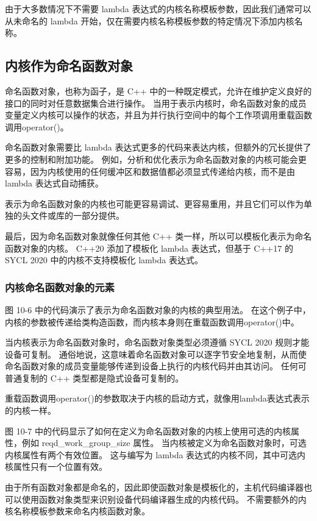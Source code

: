 由于大多数情况下不需要 lambda 表达式的内核名称模板参数，因此我们通常可以从未命名的 lambda 开始，仅在需要内核名称模板参数的特定情况下添加内核名称。

\subsection{内核作为命名函数对象}
命名函数对象，也称为函子，是 C++ 中的一种既定模式，允许在维护定义良好的接口的同时对任意数据集合进行操作。 当用于表示内核时，命名函数对象的成员变量定义内核可以操作的状态，并且为并行执行空间中的每个工作项调用重载函数调用operator()。

命名函数对象需要比 lambda 表达式更多的代码来表达内核，但额外的冗长提供了更多的控制和附加功能。 例如，分析和优化表示为命名函数对象的内核可能会更容易，因为内核使用的任何缓冲区和数据值都必须显式传递给内核，而不是由 lambda 表达式自动捕获。

表示为命名函数对象的内核也可能更容易调试、更容易重用，并且它们可以作为单独的头文件或库的一部分提供。

最后，因为命名函数对象就像任何其他 C++ 类一样，所以可以模板化表示为命名函数对象的内核。 C++20 添加了模板化 lambda 表达式，但基于 C++17 的 SYCL 2020 中的内核不支持模板化 lambda 表达式。

\subsubsection{内核命名函数对象的元素}
图 10-6 中的代码演示了表示为命名函数对象的内核的典型用法。 在这个例子中，内核的参数被传递给类构造函数，而内核本身则在重载函数调用operator()中。

当内核表示为命名函数对象时，命名函数对象类型必须遵循 SYCL 2020 规则才能设备可复制。 通俗地说，这意味着命名函数对象可以逐字节安全地复制，从而使命名函数对象的成员变量能够传递到设备上执行的内核代码并由其访问。 任何可普通复制的 C++ 类型都是隐式设备可复制的。

重载函数调用operator()的参数取决于内核的启动方式，就像用lambda表达式表示的内核一样。

图 10-7 中的代码显示了如何在定义为命名函数对象的内核上使用可选的内核属性，例如 reqd\_work\_group\_size 属性。 当内核被定义为命名函数对象时，可选内核属性有两个有效位置。 这与编写为 lambda 表达式的内核不同，其中可选内核属性只有一个位置有效。

由于所有函数对象都是命名的，因此即使函数对象是模板化的，主机代码编译器也可以使用函数对象类型来识别设备代码编译器生成的内核代码。 不需要额外的内核名称模板参数来命名内核函数对象。

